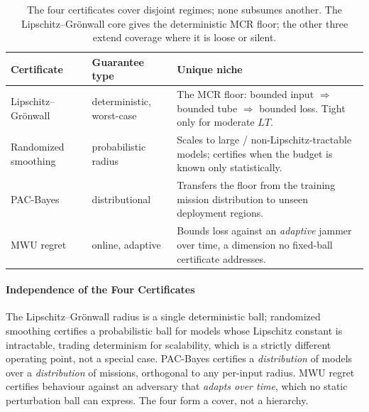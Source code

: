 \begin{table}[t]
\centering
\caption{The four certificates cover disjoint regimes; none subsumes another.
The Lipschitz--Gr\"onwall core gives the deterministic MCR floor; the other
three extend coverage where it is loose or silent.}
\label{tab:certs}
\small
\renewcommand{\arraystretch}{1.05}
\begin{tabularx}{\columnwidth}{@{}
  >{\hsize=0.82\hsize\raggedright\arraybackslash}X
  >{\hsize=0.70\hsize\raggedright\arraybackslash}X
  >{\hsize=1.48\hsize\raggedright\arraybackslash}X@{}}
\toprule
\textbf{Certificate} & \textbf{Guarantee type} & \textbf{Unique niche}\\
\midrule
Lipschitz--Gr\"onwall & deterministic, worst-case & The MCR floor: bounded input $\Rightarrow$ bounded tube $\Rightarrow$ bounded loss. Tight only for moderate $LT$.\\
Randomized smoothing~\cite{cohen2019smoothing} & probabilistic radius & Scales to large / non-Lipschitz-tractable models; certifies when the budget is known only statistically.\\
PAC-Bayes~\cite{viallard2021pacbayes} & distributional & Transfers the floor from the training mission distribution to unseen deployment regions.\\
MWU regret~\cite{arora2012mwu,balcan2015commitment} & online, adaptive & Bounds loss against an \emph{adaptive} jammer over time, a dimension no fixed-ball certificate addresses.\\
\bottomrule
\end{tabularx}
\end{table}

\paragraph{Independence of the Four Certificates}
The Lipschitz--Gr\"onwall radius is a single deterministic ball; randomized
smoothing certifies a probabilistic ball for models whose Lipschitz constant is
intractable, trading determinism for scalability, which is a strictly different
operating point, not a special case. PAC-Bayes certifies a \emph{distribution}
of models over a \emph{distribution} of missions, orthogonal to any per-input
radius. MWU regret certifies behaviour against an adversary that \emph{adapts
over time}, which no static perturbation ball can express. The four form a
cover, not a hierarchy.

